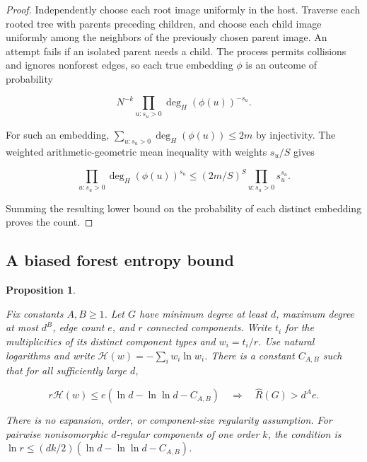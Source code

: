 \documentclass[11pt]{amsart}
\newtheorem{proposition}[theorem]{Proposition}
\theoremstyle{definition}
\theoremstyle{remark}
\numberwithin{equation}{section}
\begin{document}
\begin{proof}

Independently choose each root image uniformly in the host. Traverse each rooted tree with parents preceding children, and choose each child image uniformly among the neighbors of the previously chosen parent image. An attempt fails if an isolated parent needs a child. The process permits collisions and ignores nonforest edges, so each true embedding $\phi$ is an outcome of probability

\begin{equation}
N^{-k}\prod_{u:s_u>0}\deg_H(\phi(u))^{-s_u}.
\end{equation}

For such an embedding, $\sum_{u:s_u>0}\deg_H(\phi(u))\le 2m $ by injectivity. The weighted arithmetic-geometric mean inequality with weights $ s_u/S$ gives

\begin{equation}
\prod_{u:s_u>0}\deg_H(\phi(u))^{s_u}
 \le (2m/S)^S\prod_{u:s_u>0}s_u^{s_u}.
\end{equation}

Summing the resulting lower bound on the probability of each distinct embedding proves the count.

\end{proof}

\subsection{A biased forest entropy bound}

\begin{proposition}\label{prop:forest-entropy}

Fix constants $A,B\ge1$. Let $ G $ have minimum degree at least $ d $, maximum degree at most $ d^B $, edge count $ e $, and $ r $ connected components. Write $ t_i $ for the multiplicities of its distinct component types and $ w_i=t_i/r $. Use natural logarithms and write $\mathcal H(w)=-\sum_i w_i\ln w_i $. There is a constant $ C_{A,B}$ such that for all sufficiently large $ d$,

\begin{equation}
r\mathcal H(w)\le e(\ln d-\ln\ln d-C_{A,B})
 \quad\Longrightarrow\quad
 \widehat R(G)>d^A e.
\end{equation}

There is no expansion, order, or component-size regularity assumption. For pairwise nonisomorphic $d $-regular components of one order $ k $, the condition is $\ln r\le (dk/2)(\ln d-\ln\ln d-C_{A,B})$.

\end{proposition}
\end{document}
